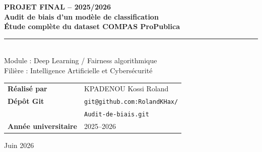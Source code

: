 \documentclass[12pt,a4paper]{report}
\begin{document}
\hypersetup{pageanchor=false}

\begin{titlepage}
  \thispagestyle{empty}

  \vspace*{1.2cm}
  \begin{center}
  \begin{minipage}{0.95\textwidth}
    \begin{tcolorbox}[
      enhanced, arc=6pt,
      colback=white, colframe=primarycolor,
      boxrule=1.5pt, left=20pt, right=20pt, top=18pt, bottom=18pt
    ]
      \centering
      {\color{secondarycolor}\small\textbf{PROJET FINAL -- 2025/2026}}\\[8pt]
      {\color{primarydark}\huge\bfseries Audit de biais d'un modèle de classification}\\[12pt]
      {\color{primarycolor}\Large\bfseries Étude complète du dataset COMPAS ProPublica}\\[14pt]
      \color{primarycolor}\rule{0.7\linewidth}{1.5pt}\\[12pt]
      {\color{secondarycolor}\normalsize Module : Deep Learning / Fairness algorithmique}\\[2pt]
      {\color{secondarycolor}\normalsize Filière : Intelligence Artificielle et Cybersécurité}
    \end{tcolorbox}
  \end{minipage}

  \vspace{2cm}
  \begin{minipage}{0.85\textwidth}
    \begin{tcolorbox}[
      enhanced, arc=5pt, colback=codebg,
      colframe=secondarycolor!30, boxrule=0.6pt,
      left=20pt, right=20pt, top=12pt, bottom=12pt
    ]
      \begin{tabular}{@{}ll}
        \color{secondarycolor}\small\textbf{Réalisé par} &
          \color{primarydark}\small KPADENOU Kossi Roland \\[6pt]
        \color{secondarycolor}\small\textbf{Dépôt Git} &
          \color{primarydark}\small\texttt{git@github.com:RolandKHax/} \\
        & \color{primarydark}\small\texttt{Audit-de-biais.git} \\[6pt]
        \color{secondarycolor}\small\textbf{Année universitaire} &
          \color{primarydark}\small 2025--2026 \\
      \end{tabular}
    \end{tcolorbox}
  \end{minipage}

  \vfill
  {\color{secondarycolor}\large Juin 2026}
  \end{center}
\end{titlepage}
\clearpage
\hypersetup{pageanchor=true}
\end{document}
